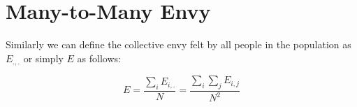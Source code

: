 \section{Many-to-Many Envy}

Similarly we can define the collective envy felt by all people in the population as $E_{.,.}$ or simply $E$ as follows:

\begin{equation}
    E = \frac{\sum_{i} E_{i,.}}{N} 
    = \frac{\sum_{i} \sum_{j} E_{i,j}}{N^2}
\end{equation}